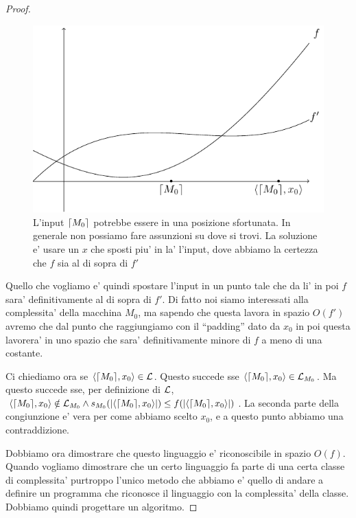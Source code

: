 \begin{proof}
    \begin{figure}[h]
        \begin{center}
            \includegraphics{./img/timespacehierarchies/spacehierarchy.pdf}
            \caption{L'input $\lceil M_{0} \rceil$ potrebbe essere in una posizione sfortunata. In generale
            non possiamo fare assunzioni su dove si trovi. La soluzione e' usare un $x$ che sposti
            piu' in la' l'input, dove abbiamo la certezza che $f$ sia al di sopra di $f'$}
            \label{img:spacehierarchy}
        \end{center}
    \end{figure}

    Quello che vogliamo e' quindi spostare l'input in un punto tale che da li' in poi $f$ sara'
    definitivamente al di sopra di $f'$. Di fatto noi siamo interessati alla complessita' della
    macchina $M_{0}$, ma sapendo che questa lavora in spazio $O(f')$ avremo che dal punto che
    raggiungiamo con il ``padding'' dato da $x_{0}$ in poi questa lavorera' in uno spazio che sara'
    definitivamente minore di $f$ a meno di una costante.

    Ci chiediamo ora se $\langle \lceil M_{0} \rceil, x_{0} \rangle \in \mathcal{L}$. Questo succede sse
    $\langle \lceil M_{0} \rceil, x_{0} \rangle \in \mathcal{L}_{M_{0}}$. Ma questo succede sse, per definizione di
    $\mathcal{L}$, $\langle \lceil M_{0} \rceil, x_{0} \rangle \notin \mathcal{L}_{M_{0}} \land
    s_{M_{0}}(|\langle \lceil M_{0} \rceil, x_{0} \rangle|) \leq f(|\langle \lceil M_{0} \rceil, x_{0} \rangle|)$. La seconda parte
    della congiunzione e' vera per come abbiamo scelto $x_{0}$, e a questo punto abbiamo una
    contraddizione.

    Dobbiamo ora dimostrare che questo linguaggio e' riconoscibile in spazio $O(f)$. Quando vogliamo
    dimostrare che un certo linguaggio fa parte di una certa classe di complessita' purtroppo l'unico
    metodo che abbiamo e' quello di andare a definire un programma che riconosce il linguaggio con la
    complessita' della classe. Dobbiamo quindi progettare un algoritmo.


\end{proof}
